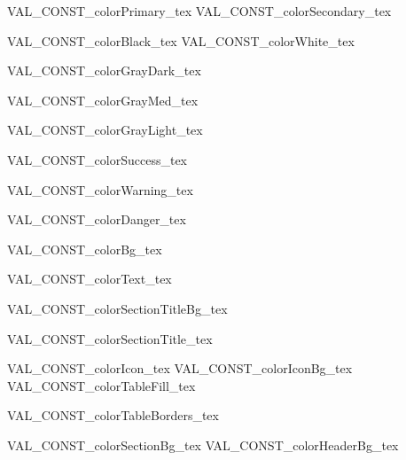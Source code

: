 



VAL_CONST_colorPrimary_tex
VAL_CONST_colorSecondary_tex

VAL_CONST_colorBlack_tex
VAL_CONST_colorWhite_tex

VAL_CONST_colorGrayDark_tex

VAL_CONST_colorGrayMed_tex

VAL_CONST_colorGrayLight_tex



VAL_CONST_colorSuccess_tex

VAL_CONST_colorWarning_tex

VAL_CONST_colorDanger_tex

VAL_CONST_colorBg_tex

VAL_CONST_colorText_tex

VAL_CONST_colorSectionTitleBg_tex

VAL_CONST_colorSectionTitle_tex


VAL_CONST_colorIcon_tex
VAL_CONST_colorIconBg_tex
VAL_CONST_colorTableFill_tex

\renewcommand{\setColorCell}{%
    \cellcolor{colorTableFill}%
}
VAL_CONST_colorTableBorders_tex



VAL_CONST_colorSectionBg_tex
VAL_CONST_colorHeaderBg_tex
